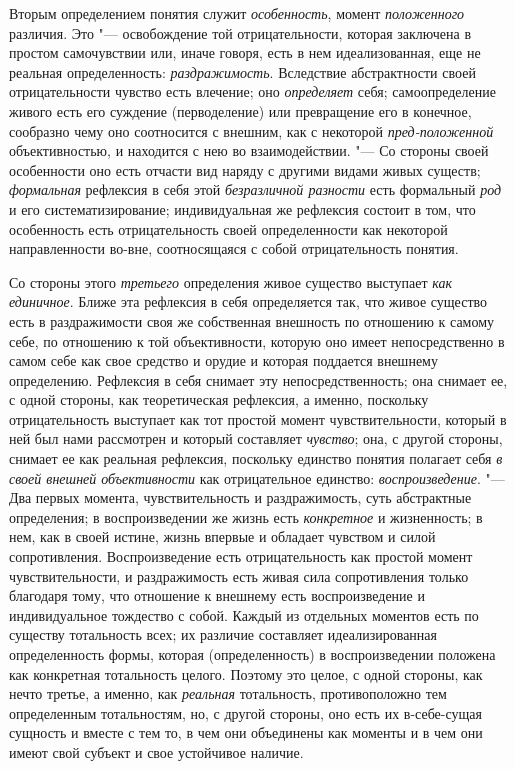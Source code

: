 {{Вторым определением понятия служит
{\em особенность}, момент
{\em положенного}
различия. Это "--- освобождение той
отрицательности, которая заключена в простом самочувствии или, иначе
говоря, есть в нем идеализованная, еще не реальная определенность:
{\em раздражимость}.
Вследствие абстрактности своей отрицательности чувство есть
влечение; оно {\em определяет}
себя; самоопределение живого есть его суждение (перводеление)
или превращение его в конечное, сообразно чему оно соотносится с внешним,
как с некоторой {\em пред-положенной}
объективностью, и находится с нею во взаимодействии. "---
Со стороны своей особенности оно есть отчасти вид наряду с
другими видами живых существ;
{\em формальная}
рефлексия в себя этой
{\em безразличной разности}
есть формальный {\em род}
и его систематизирование; индивидуальная же рефлексия состоит
в том, что особенность есть отрицательность своей определенности как
некоторой направленности во-вне, соотносящаяся с собой отрицательность
понятия.

Со стороны этого
{\em третьего}
определения живое существо выступает
{\em как единичное}.
Ближе эта рефлексия в себя определяется так, что живое
существо есть в раздражимости своя же собственная внешность по отношению к
самому себе, по отношению к той объективности, которую оно имеет
непосредственно в самом себе как свое средство и орудие и которая поддается
внешнему определению. Рефлексия в себя снимает эту непосредственность; она
снимает ее, с одной стороны, как теоретическая рефлексия, а именно,
поскольку отрицательность выступает как тот простой момент
чувствительности, который в ней был нами рассмотрен и который составляет
{\em чувство}; она, с
другой стороны, снимает ее как реальная рефлексия, поскольку единство
понятия полагает себя {\em в своей
внешней объективности} как отрицательное единство:
{\em воспроизведение}. "---
Два первых момента, чувствительность и раздражимость, суть
абстрактные определения; в воспроизведении же жизнь есть
{\em конкретное} и
жизненность; в нем, как в своей истине, жизнь впервые и обладает чувством и
силой сопротивления. Воспроизведение есть отрицательность как простой
момент чувствительности, и раздражимость есть живая сила сопротивления
только благодаря тому, что отношение к внешнему есть воспроизведение и
индивидуальное тождество с собой. Каждый из отдельных
моментов есть по существу тотальность всех; их различие составляет
идеализированная определенность формы, которая (определенность) в
воспроизведении положена как конкретная тотальность целого. Поэтому это
целое, с одной стороны, как нечто третье, а именно, как
{\em реальная}
тотальность, противоположно тем определенным тотальностям,
но, с другой стороны, оно есть их в-себе-сущая сущность и вместе с тем то,
в чем они объединены как моменты и в чем они имеют свой субъект и свое
устойчивое наличие.

}}
